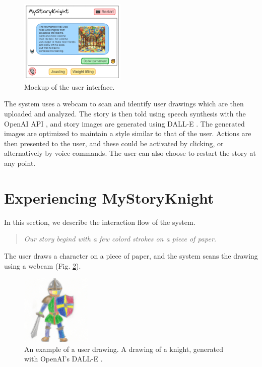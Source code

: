 \documentclass[submit,techrep,english]{ipsj}
\begin{document}
\begin{figure}[h]
    \centering
    \includegraphics[width=0.45\textwidth]{figures/user-interface.png}
    \caption{Mockup of the user interface.}
    \label{fig:user-interface}
\end{figure}

The system uses a webcam to scan and identify user drawings which are then uploaded and analyzed. The story is then told using speech synthesis with the OpenAI API \cite{21:openai-api}, and story images are generated using DALL-E \cite{22:dalle}. The generated images are optimized to maintain a style similar to that of the user. Actions are then presented to the user, and these could be activated by clicking, or alternatively by voice commands. The user can also choose to restart the story at any point.

\section{Experiencing MyStoryKnight}
\label{subsec:using-mystoryknight}
In this section, we describe the interaction flow of the system.

\vspace{10pt} %

\begin{quote}
    \textit{Our story begind with a few colord strokes on a piece of paper.}
\end{quote}

\vspace{10pt} %

The user draws a character on a piece of paper, and the system scans the drawing using a webcam (Fig. \ref{fig:knight}).

\begin{figure}[h]
    \centering
    \includegraphics[width=0.3\textwidth]{figures/knight.png}
    \caption{An example of a user drawing. A drawing of a knight, generated with OpenAI's DALL-E \cite{22:dalle}.}
    \label{fig:knight}
\end{figure}
\end{document}
